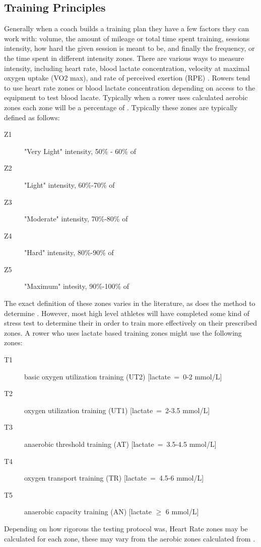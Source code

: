 \subsection{Training Principles}
Generally when a coach builds a training plan they have a few factors they can work with: volume, the amount of mileage or total time spent training, sessions intensity, how hard the given session is meant to be, and finally the frequency, or the time spent in different intensity zones. There are various ways to measure intensity, including heart rate, blood lactate concentration, velocity at maximal oxygen uptake (VO2 max), and rate of perceived exertion (RPE) \autocite{Rosenblat2019}. Rowers tend to use heart rate zones or blood lactate concentration depending on access to the equipment to test blood lacate. Typically when a rower uses calculated aerobic zones each zone will be a percentage of \maxHR. Typically these zones are typically defined as follows:
\begin{description}
  \item[Z1] "Very Light" intensity, 50\% - 60\% of \maxHR
  \item[Z2] "Light" intensity, 60\%-70\% of \maxHR
  \item[Z3] "Moderate" intensity, 70\%-80\% of \maxHR
  \item[Z4] "Hard" intensity, 80\%-90\% of \maxHR
  \item[Z5] "Maximum" intesity, 90\%-100\% of \maxHR
\end{description}
The exact definition of these zones varies in the literature, as does the method to determine \maxHR. However, most high level athletes will have completed some kind of stress test to determine their \maxHR in order to train more effectively on their prescribed zones.
A rower who uses lactate based training zones might use the following zones:
\begin{description}
  \item[T1]  basic oxygen utilization training (UT2) [lactate~=~0-2 mmol/L]
  \item[T2]  oxygen utilization training (UT1) [lactate~=~2-3.5 mmol/L]
  \item[T3]  anaerobic threshold training (AT) [lactate~=~3.5-4.5 mmol/L]
  \item[T4]  oxygen transport training (TR) [lactate~=~4.5-6 mmol/L]
  \item[T5]  anaerobic capacity training (AN) [lactate $\geq$ 6 mmol/L] \autocite{Das2022}
\end{description}
Depending on how rigorous the testing protocol was, Heart Rate zones may be calculated for each zone, these may vary from the aerobic zones calculated from \maxHR. 

